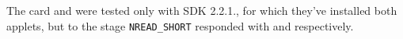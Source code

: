             The card \Dcard and \Jcard were tested only with SDK 2.2.1., for which they've installed both applets, but to the stage \texttt{NREAD_SHORT} responded with \scardenottransacted and \scardwunpoweredcard respectively.












